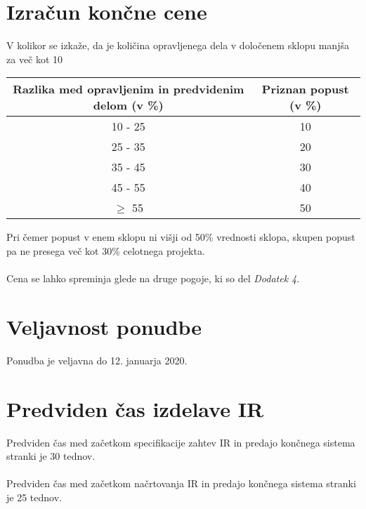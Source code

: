 \documentclass[12pt]{report}
\begin{document}
\section{Izračun končne cene}
V kolikor se izkaže, da je količina opravljenega dela v določenem sklopu manjša za več kot 10%

\begin{center}
    \begin{tabular}{|c|c|}
        \hline
        Razlika med opravljenim in predvidenim delom (v \%) & Priznan popust (v \%)\\
        \hline
        10 - 25 & 10\\
        25 - 35 & 20\\
        35 - 45 & 30\\
        45 - 55 & 40\\
        $\geq$ 55 & 50\\
        \hline
    \end{tabular}
\end{center}

Pri čemer popust v enem sklopu ni višji od 50\% vrednosti sklopa, skupen popust pa ne presega več kot 30\% celotnega projekta.\\\\
Cena se lahko spreminja glede na druge pogoje, ki so del \textit{Dodatek 4}.

\section{Veljavnost ponudbe}
Ponudba je veljavna do 12. januarja 2020.

\pagebreak
\section{Predviden čas izdelave IR}
Predviden čas med začetkom specifikacije zahtev IR in predajo končnega sistema stranki je 30 tednov.\\\\
Predviden čas med začetkom načrtovanja IR in predajo končnega sistema stranki je 25 tednov.
\end{document}
